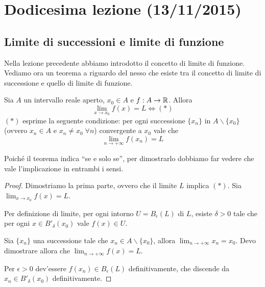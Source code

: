 \chapter{Dodicesima lezione (13/11/2015)}

\section{Limite di successioni e limite di funzione}

Nella lezione precedente abbiamo introdotto il concetto di limite di funzione. Vediamo ora un teorema a riguardo del nesso che esiste tra il concetto di limite di successione e quello di limite di funzione.

\begin{theorem}
Sia $A$ un intervallo reale aperto, $x_0 \in A$ e $f: A \to \mathbb R$. Allora
\begin{equation*}
\lim_{x \to x_0} f(x) = L \iff (*)
\end{equation*}
$(*)$ esprime la seguente condizione: per ogni successione $\{x_n\}$ in $A\backslash\{x_0\}$ (ovvero $x_n \in A$ e $x_n \neq x_0 \; \forall n$) convergente a $x_0$ vale che
\begin{equation*}
\lim_{n \to +\infty} f(x_n) = L
\end{equation*}
\end{theorem}

Poiché il teorema indica ``se e solo se'', per dimostrarlo dobbiamo far vedere che vale l'implicazione in entrambi i sensi.

\begin{proof}
Dimostriamo la prima parte, ovvero che il limite $L$ implica $(*)$. Sia $
\lim_{x \to x_0} f(x) = L$.


Per definizione di limite, per ogni intorno $U = B_\epsilon (L)$ di $L$, esiste $\delta > 0$ tale che per ogni $x \in B'_\delta (x_0)$ vale $f(x) \in U$.

Sia $\{x_n\}$ una successione tale che $x_n \in A\backslash \{x_0\}$, allora $\lim_{n \to +\infty} x_n = x_0$. Devo dimostrare allora che $\lim_{n \to +\infty} f(x) = L$.

Per $\epsilon > 0$ dev'essere $f(x_n) \in B_\epsilon (L)$ definitivamente, che discende da $x_n \in B'_\delta (x_0)$ definitivamente.
\end{proof}

